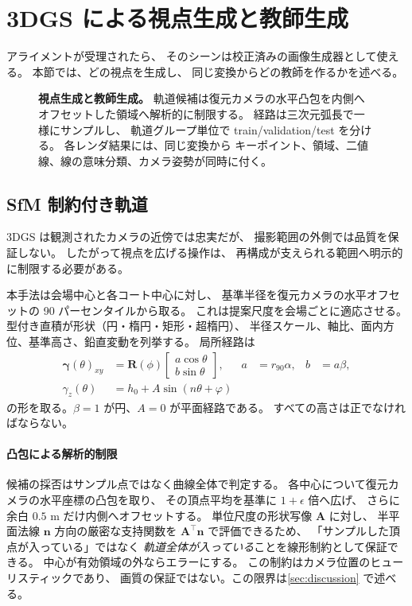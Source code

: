 \section{3DGS による視点生成と教師生成}
\label{sec:view_generation}

アライメントが受理されたら、
そのシーンは校正済みの画像生成器として使える。
本節では、どの視点を生成し、
同じ変換からどの教師を作るかを述べる。

\begin{figure}[t]
  \centering
  \resizebox{\linewidth}{!}{}
  \caption{\textbf{視点生成と教師生成。}
  軌道候補は復元カメラの水平凸包を内側へオフセットした領域へ解析的に制限する。
  経路は三次元弧長で一様にサンプルし、
  軌道グループ単位で train/validation/test を分ける。
  各レンダ結果には、同じ変換から
  キーポイント、領域、二値線、線の意味分類、カメラ姿勢が同時に付く。
  }
  \label{fig:view_generation}
\end{figure}

\subsection{SfM 制約付き軌道}
\label{sec:trajectories}

3DGS は観測されたカメラの近傍では忠実だが、
撮影範囲の外側では品質を保証しない。
したがって視点を広げる操作は、
再構成が支えられる範囲へ明示的に制限する必要がある。

本手法は会場中心と各コート中心に対し、
基準半径を復元カメラの水平オフセットの 90 パーセンタイルから取る。
これは提案尺度を会場ごとに適応させる。
型付き直積が形状（円・楕円・矩形・超楕円）、
半径スケール、軸比、面内方位、基準高さ、鉛直変動を列挙する。
局所経路は
\begin{align}
  \bm{\gamma}(\theta)_{xy}
    &=\mathbf{R}(\phi)
      \begin{bmatrix}a\cos\theta\\b\sin\theta\end{bmatrix},
      &a&=r_{90}\alpha, &b&=a\beta, \\
  \gamma_z(\theta)
    &=h_0+A\sin(n\theta+\varphi)
  \label{eq:trajectory}
\end{align}
の形を取る。\(\beta=1\) が円、\(A=0\) が平面経路である。
すべての高さは正でなければならない。

\paragraph{凸包による解析的制限}
候補の採否はサンプル点ではなく曲線全体で判定する。
各中心について復元カメラの水平座標の凸包を取り、
その頂点平均を基準に \(1+\epsilon\) 倍へ広げ、
さらに余白 \(0.5\) m だけ内側へオフセットする。
単位尺度の形状写像 \(\mathbf{A}\) に対し、
半平面法線 \(\mathbf{n}\) 方向の厳密な支持関数を
\(\mathbf{A}^{\top}\mathbf{n}\) で評価できるため、
「サンプルした頂点が入っている」ではなく
\emph{軌道全体が入っている}ことを線形制約として保証できる。
中心が有効領域の外ならエラーにする。
この制約はカメラ位置のヒューリスティックであり、
画質の保証ではない。この限界は\cref{sec:discussion} で述べる。

